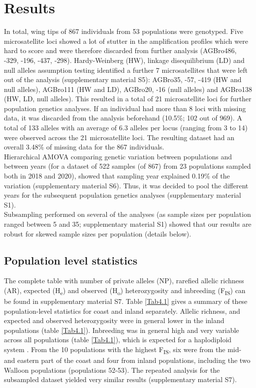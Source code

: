 \documentclass[10pt, twoside]{book} %
\begin{document}
	\section{Results}
	In total, wing tips of 867 individuals from 53 populations were genotyped. Five microsatellite loci showed a lot of stutter in the amplification profiles which were hard to score and were therefore discarded from further analysis (AGBro486, -329, -196, -437, -298). Hardy-Weinberg (HW), linkage disequilibrium (LD) and null alleles assumption testing identified a further 7 microsatellites that were left out of the analysis (supplementary material S5): AGBro35, -57, -419 (HW and null alleles), AGBro111 (HW and LD), AGBro20, -16 (null alleles) and AGBro138 (HW, LD, null alleles). This resulted in a total of 21 microsatellite loci for further population genetics analyses. If an individual had more than 8 loci with missing data, it was discarded from the analysis beforehand (10.5$\%$; 102 out of 969). A total of 133 alleles with an average of 6.3 alleles per locus (ranging from 3 to 14) were observed across the 21 microsatellite loci. The resulting dataset had an overall 3.48$\%$ of missing data for the 867 individuals.\\
	
	Hierarchical AMOVA comparing genetic variation between populations and between years (for a dataset of 522 samples (of 867) from 23 populations sampled both in 2018 and 2020), showed that sampling year explained 0.19$\%$ of the variation (supplementary material S6). Thus, it was decided to pool the different years for the subsequent population genetics analyses (supplementary material S1).\\
	
	Subsampling performed on several of the analyses (as sample sizes per population ranged between 5 and 35; supplementary material S1) showed that our results are robust for skewed sample sizes per population (details below).
	
	\subsection{Population level statistics}
	The complete table with number of private alleles (NP), rarefied allelic richness (AR), expected (H\textsubscript{e}) and observed (H\textsubscript{o}) heterozygosity and inbreeding (F\textsubscript{IS}) can be found in supplementary material S7. Table \ref{Tab4.1} gives a summary of these population-level statistics for coast and inland separately. Allelic richness, and expected and observed heterozygosity were in general lower in the inland populations (table \ref{Tab4.1}). Inbreeding was in general high and very variable across all populations (table \ref{Tab4.1}), which is expected for a haplodiploid system \citep{zayed2004}. From the 10 populations with the highest F\textsubscript{IS}, six were from the mid- and eastern part of the coast and four from inland populations, including the two Walloon populations (populations 52-53). The repeated analysis for the subsampled dataset yielded very similar results (supplementary material S7).\\
\end{document}
